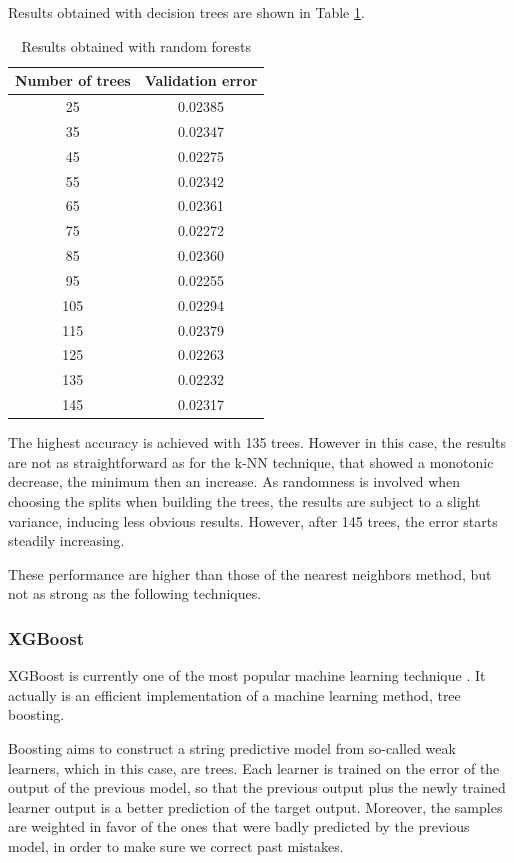 Results obtained with decision trees are shown in Table \ref{tab:trees-results}.

\begin{table}[h]
    \centering
    \begin{tabular}{|c|c|}
        \hline
        Number of trees & Validation error \\ \hline
        25  & 0.02385 \\
        35  & 0.02347 \\
        45  & 0.02275 \\
        55  & 0.02342 \\
        65  & 0.02361 \\
        75  & 0.02272 \\
        85  & 0.02360 \\
        95  & 0.02255 \\
        105 & 0.02294 \\
        115 & 0.02379 \\
        125 & 0.02263 \\
        135 & 0.02232 \\
        145 & 0.02317 \\ \hline
    \end{tabular}
    \caption{Results obtained with random forests}
    \label{tab:trees-results}
\end{table}

The highest accuracy is achieved with 135 trees. However in this case, the results are not as straightforward as for the k-NN technique, that showed a monotonic decrease, the minimum then an increase. As randomness is involved when choosing the splits when building the trees, the results are subject to a slight variance, inducing less obvious results. However, after 145 trees, the error starts steadily increasing.

These performance are higher than those of the nearest neighbors method, but not as strong as the following techniques.

\subsubsection{XGBoost}

XGBoost is currently one of the most popular machine learning technique \cite{XGBoost}. It actually is an efficient implementation of a machine learning method, tree boosting.

Boosting aims to construct a string predictive model from so-called weak learners, which in this case, are trees. Each learner is trained on the error of the output of the previous model, so that the previous output plus the newly trained learner output is a better prediction of the target output. Moreover, the samples are weighted in favor of the ones that were badly predicted by the previous model, in order to make sure we correct past mistakes.

